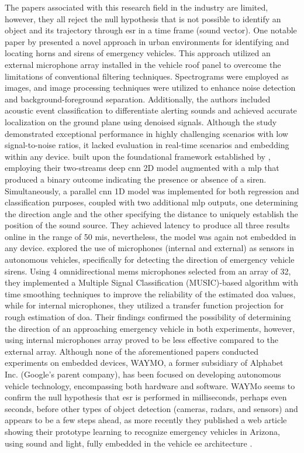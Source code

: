 The papers associated with this research field in the industry are limited, however, they all reject the null hypothesis that is not possible to identify an object and its trajectory through \gls{esr} in a time frame (sound vector). One notable paper by \textcite{Marchegiani2022} presented a novel approach in urban environments for identifying and locating horns and sirens of emergency vehicles. This approach utilized an external microphone array installed in the vehicle roof panel to overcome the limitations of conventional filtering techniques. Spectrograms were employed as images, and image processing techniques were utilized to enhance noise detection and background-foreground separation. Additionally, the authors included acoustic event classification to differentiate alerting sounds and achieved accurate localization on the ground plane using denoised signals. Although the study demonstrated exceptional performance in highly challenging scenarios with low signal-to-noise ratios, it lacked evaluation in real-time scenarios and embedding within any device. \textcite{Sun2021} built upon the foundational framework established by \textcite{Tran2020}, employing their two-streams deep \gls{cnn} 2D model augmented with a \gls{mlp} that produced a binary outcome indicating the presence or absence of a siren. Simultaneously, a parallel \gls{cnn} 1D model was implemented for both regression and classification purposes, coupled with two additional \gls{mlp} outputs, one determining the direction angle and the other specifying the distance to uniquely establish the position of the sound source. They achieved latency to produce all three results online in the range of 50 \gls{mi}\gls{s}, nevertheless, the model was again not embedded in any device. \textcite{Shabtai2019} explored the use of microphones (internal and external) as sensors in autonomous vehicles, specifically for detecting the direction of emergency vehicle sirens. Using 4 omnidirectional \gls{mems} microphones selected from an array of 32, they implemented a Multiple Signal Classification (MUSIC)-based algorithm with time smoothing techniques to improve the reliability of the estimated \gls{doa} values, while for internal microphones, they utilized a transfer function projection for rough estimation of \gls{doa}. Their findings confirmed the possibility of determining the direction of an approaching emergency vehicle in both experiments, however, using internal microphones array proved to be less effective compared to the external array. Although none of the aforementioned papers conducted experiments on embedded devices, WAYMO, a former subsidiary of Alphabet Inc. (Google's parent company), has been focused on developing autonomous vehicle technology, encompassing both hardware and software. WAYMo seems to confirm the null hypothesis that \gls{esr} is performed in milliseconds, perhaps even seconds, before other types of object detection (cameras, radars, and sensors) and appears to be a few steps ahead, as more recently they published a web article showing their prototype learning to recognize emergency vehicles in Arizona, using sound and light, fully embedded in the vehicle \gls{ee} architecture \cite{WAYMO2023}. 


